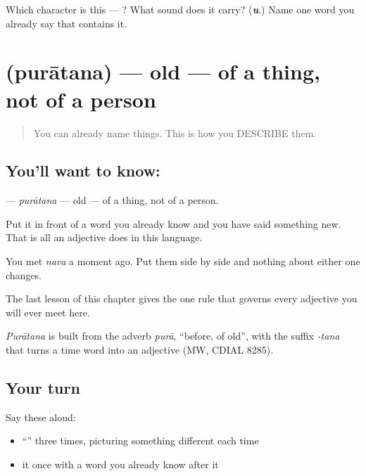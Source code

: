 \begin{tcolorbox}[breakable,colback=teal!4,colframe=teal!35!black,title={Before you move on}]
Which character is this — ? What sound does it carry? (\emph{\textbf{u}}.) Name one word you already say that contains it.
\end{tcolorbox}
\section[\texorpdfstring{\sk{पुरातन} (purātana)}{पुरातन (purātana)}]{ (purātana) — old — of a thing, not of a person}

\label{lesson:SA-C15-old}



\begin{quote}
You can already name things. This is how you DESCRIBE them.
\end{quote}

\subsection*{You'll want to know: }
\textbf{} — \emph{purātana} — old — of a thing, not of a person.

Put it in front of a word you already know and you have said something new. That is all an adjective does in this language.

You met \textbf{} \emph{nava} a moment ago. Put them side by side and nothing about either one changes.

The last lesson of this chapter gives the one rule that governs every adjective you will ever meet here.

\begin{cousinweb}
\emph{Purātana} is built from the adverb \emph{purā}, \textquotedblleft{}before, of old\textquotedblright{}, with the suffix \emph{-tana} that turns a time word into an adjective (MW, CDIAL 8285).
\end{cousinweb}

\subsection*{Your turn}
Say these aloud:

\begin{itemize}
\raggedright
  \item \textquotedblleft{}\textquotedblright{} three times, picturing something different each time
  \item it once with a word you already know after it
\end{itemize}

